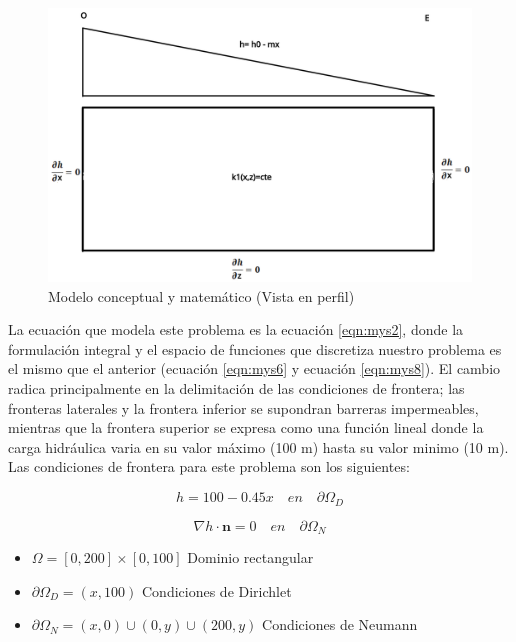 \begin{figure}[H]
\centering
\includegraphics[scale=0.35]{Figura_27a.png}
\caption{ Modelo conceptual y matemático (Vista en perfil)}
\label{Figura3:3}
\end{figure}


La ecuación que modela este problema es la ecuación \ref{eqn:mys2}, donde la formulación integral y el espacio de funciones que discretiza nuestro problema es el mismo que el anterior (ecuación \ref{eqn:mys6} y ecuación \ref{eqn:mys8}). El cambio radica principalmente en la delimitación de las condiciones de frontera; las fronteras laterales y la frontera inferior se supondran barreras impermeables, mientras que la frontera superior se expresa como una función lineal donde la carga hidráulica varia en su valor máximo (100 m) hasta su valor minimo (10 m). Las condiciones de frontera para este problema son los siguientes:  

\begin{equation}
 \label{eqn:mys9}
    h=100-0.45x \quad en \quad {\partial}\Omega_{D}  
\end{equation}
 
\begin{equation}
 \label{eqn:mys10}
  {\nabla}h{\cdot}\textbf{n}=0 \quad en \quad {\partial}{\Omega}_{N} 
\end{equation}  

\begin{itemize}
\item  $\Omega=[0,200]{\times}[0,100]$ Dominio rectangular
\item  ${\partial}\Omega_{D}={(x,100)}$ Condiciones de Dirichlet
\item  ${\partial}\Omega_{N}={(x,0){\cup}(0,y){\cup}(200,y)}$ Condiciones de Neumann
\end{itemize}

